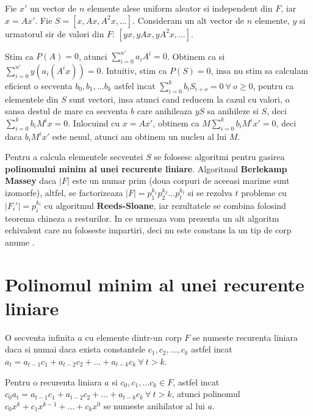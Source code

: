 Fie $x'$ un vector de $n$ elemente alese uniform aleator si independent din $F$,
iar $x = Ax'$. Fie $S = [x, Ax, A^{2}x, \ldots]$.
Consideram un alt vector de $n$ elemente, $y$ si urmatorul sir de valori din $F$: $[yx, yAx, yA^{2}x, \ldots ]$.

Stim ca $P(A) = 0$, atunci $\sum_{i=0}^{n'} a_{i} A^{i} = 0$. Obtinem ca si
$\sum_{i=0}^{n'} y (a_{i} (A^{i} x)) = 0$. Intuitiv, stim ca $P(S) = 0$, insa nu
stim sa calculam eficient o secventa $b_{0}, b_{1}, \ldots b_{k}$ astfel incat
$\sum_{i=0}^{k} b_{i} S_{i+o} = 0 \ \forall \ o \geq 0$, pentru ca elementele din $S$ sunt vectori, insa
atunci cand reducem la cazul cu valori, o sansa destul de mare ca secventa $b$
care anihileaza $yS$ sa anihileze si $S$, deci
$\sum_{i=0}^{k} b_{i} M^{i}x = 0$.
Inlocuind cu $x = Ax'$, obtinem ca $M \sum_{i=0}^{k} b_{i} M^{i} x' = 0$, deci
daca $b_{i} M^{i} x'$ este nenul, atunci am obtinem un nucleu al lui $M$.

Pentru a calcula elementele secventei $S$ se folosesc algoritmi pentru gasirea
\textbf{polinomului minim al unei recurente liniare}. Algoritmul
\textbf{Berlekamp Massey} daca $|F|$ este un numar prim (doua corpuri de
aceeasi marime sunt izomorfe), altfel, se factorizeaza
$|F| = p_{1}^{k_{1}} p_{2}^{k_{2}} \ldots p_{t}^{k_{t}}$ si se rezolva $t$
probleme cu $|F_{i}'| = p_{i}^{k_{i}}$ cu algoritmul \textbf{Reeds-Sloane}, iar
rezultatele se combina folosind teorema chineza a resturilor. In ce urmeaza vom
prezenta un alt algoritm echivalent care nu foloseste impartiri, deci nu este
constans la un tip de corp anume \cite{sugiyama}.

\pagebreak

\section{Polinomul minim al unei recurente liniare}

\begin{defn}
  O secventa infinita $a$ cu elemente dintr-un corp $F$ se numeste recurenta
  liniara daca si numai daca exista constantele $c_{1}, c_{2}, \ldots, c_{k}$
  astfel incat
  $a_{t} = a_{t-1}c_{1} + a_{t-2}c_{2} + \ldots + a_{t-k}c_{k} \ \forall \ t > k$.
\end{defn}

\begin{defn}
  Pentru o recurenta liniara $a$ si $c_{0}, c_{1}, \ldots c_{k} \in F$, astfel
  incat
  $c_{0} a_{t} = a_{t-1}c_{1} + a_{t-2}c_{2} + \ldots + a_{t-k}c_{k} \ \forall \ t > k$,
  atunci polinomul $c_{0} x^{k} + c_{1} x^{k-1} + \ldots + c_{k} x^{0}$ se
  numeste anihilator al lui $a$.
\end{defn}

